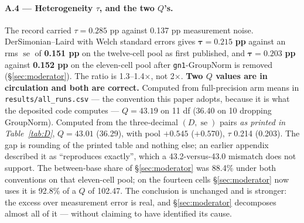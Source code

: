 \documentclass[10pt,letterpaper]{article}
\newcommand{\Dstat}{D}                         %
\newcommand{\arm}[1]{\texttt{#1}}
\DeclareMathOperator{\se}{se}
\begin{document}
\paragraph{A.4 --- Heterogeneity $\tau$, and the two $Q$'s.}
The record carried $\tau = 0.285$ pp against 0.137 pp measurement noise. DerSimonian--Laird with
Welch standard errors gives $\mathbf{\tau = 0.215}$ \textbf{pp} against an rms $\se$ of
\textbf{0.151 pp} on the twelve-cell pool as first published, and $\mathbf{\tau = 0.203}$ \textbf{pp}
against \textbf{0.152 pp} on the eleven-cell pool after \arm{gn1}-GroupNorm is removed
(\S\ref{sec:moderator}). The ratio is 1.3--1.4$\times$, not 2$\times$. \textbf{Two $Q$ values are in
circulation and both are correct.} Computed from full-precision arm means in
\texttt{results/all\_runs.csv} --- the convention this paper adopts, because it is what the deposited
code computes --- $Q = \mathbf{43.19}$ on 11 df (36.40 on 10 dropping GroupNorm). Computed from the
three-decimal $(\Dstat, \se)$ pairs \emph{as printed in Table~\ref{tab:D}}, $Q = \mathbf{43.01}$
(36.29), with pool $+0.545$ ($+0.570$), $\tau$ 0.214 (0.203). The gap is rounding of the printed
table and nothing else; an earlier appendix described it as ``reproduces exactly'', which a
43.2-versus-43.0 mismatch does not support. The between-base share of \S\ref{sec:moderator} was
88.4\% under both conventions on that eleven-cell pool; on the fourteen cells
\S\ref{sec:moderator} now uses it is 92.8\% of a $Q$ of 102.47. The conclusion is unchanged and
is stronger: the excess over measurement error is real, and \S\ref{sec:moderator} decomposes
almost all of it --- without claiming to have identified its cause.
\end{document}
